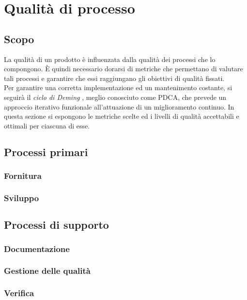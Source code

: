 

\section{Qualità di processo}
\subsection{Scopo}
La qualità di un prodotto è influenzata dalla qualità dei processi che lo compongono.
È quindi necessario dorarsi di metriche che permettano di valutare tali processi e garantire che essi
raggiungano gli obiettivi di qualità fissati.\\
Per garantire una corretta implementazione ed un mantenimento costante, si seguirà 
il \textit{ciclo di Deming} , meglio conosciuto come PDCA, che prevede un approccio iterativo funzionale
all'attuazione di un miglioramento continuo.
In questa sezione si espongono le metriche scelte ed i livelli di qualità accettabili e ottimali per ciascuna
di esse.\\

\subsection{Processi primari}

\subsubsection{Fornitura}

\subsubsection{Sviluppo}

\subsection{Processi di supporto}

\subsubsection{Documentazione}

\subsubsection{Gestione delle qualità}

\subsubsection{Verifica}

